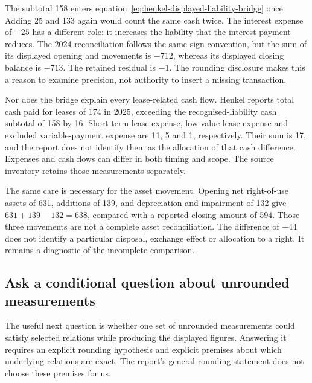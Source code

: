 The subtotal 158 enters equation~\eqref{eq:henkel-displayed-liability-bridge}
once. Adding 25 and 133 again would count the same cash twice. The interest
expense of $-25$ has a different role: it increases the liability that the
interest payment reduces. The 2024 reconciliation follows the same sign
convention, but the sum of its displayed opening and movements is $-712$,
whereas its displayed closing balance is $-713$. The retained residual is
$-1$. The rounding disclosure makes this a reason to examine precision, not
authority to insert a missing transaction.

Nor does the bridge explain every lease-related cash flow. Henkel reports
total cash paid for leases of 174 in 2025, exceeding the recognised-liability
cash subtotal of 158 by 16. Short-term lease expense, low-value lease expense
and excluded variable-payment expense are 11, 5 and 1, respectively. Their
sum is 17, and the report does not identify them as the allocation of that cash
difference. Expenses and cash flows can differ in both timing and scope. The
source inventory retains those measurements separately.

The same care is necessary for the asset movement. Opening net right-of-use
assets of 631, additions of 139, and depreciation and impairment of 132 give
$631+139-132=638$, compared with a reported closing amount of 594. Those three
movements are not a complete asset reconciliation. The difference of $-44$
does not identify a particular disposal, exchange effect or allocation to a
right. It remains a diagnostic of the incomplete comparison.

\subsection{Ask a conditional question about unrounded measurements}

The useful next question is whether one set of unrounded measurements could
satisfy selected relations while producing the displayed figures. Answering
it requires an explicit rounding hypothesis and explicit premises about which
underlying relations are exact. The report's general rounding statement does
not choose these premises for us.

